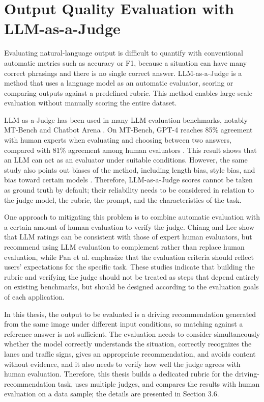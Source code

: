 \documentclass[12pt,a4paper]{report}
\begin{document}
\section{Output Quality Evaluation with LLM-as-a-Judge}

Evaluating natural-language output is difficult to quantify with conventional automatic metrics such as accuracy or F1, because a situation can have many correct phrasings and there is no single correct answer. LLM-as-a-Judge is a method that uses a language model as an automatic evaluator, scoring or comparing outputs against a predefined rubric. This method enables large-scale evaluation without manually scoring the entire dataset.

LLM-as-a-Judge has been used in many LLM evaluation benchmarks, notably MT-Bench and Chatbot Arena \cite{zheng2023mtbench}. On MT-Bench, GPT-4 reaches 85\% agreement with human experts when evaluating and choosing between two answers, compared with 81\% agreement among human evaluators \cite{zheng2023mtbench}. This result shows that an LLM can act as an evaluator under suitable conditions. However, the same study also points out biases of the method, including length bias, style bias, and bias toward certain models \cite{zheng2023mtbench}. Therefore, LLM-as-a-Judge scores cannot be taken as ground truth by default; their reliability needs to be considered in relation to the judge model, the rubric, the prompt, and the characteristics of the task.

One approach to mitigating this problem is to combine automatic evaluation with a certain amount of human evaluation to verify the judge. Chiang and Lee \cite{chiang2023llmhuman} show that LLM ratings can be consistent with those of expert human evaluators, but recommend using LLM evaluation to complement rather than replace human evaluation, while Pan et al. \cite{pan2024human} emphasize that the evaluation criteria should reflect users' expectations for the specific task. These studies indicate that building the rubric and verifying the judge should not be treated as steps that depend entirely on existing benchmarks, but should be designed according to the evaluation goals of each application.

In this thesis, the output to be evaluated is a driving recommendation generated from the same image under different input conditions, so matching against a reference answer is not sufficient. The evaluation needs to consider simultaneously whether the model correctly understands the situation, correctly recognizes the lanes and traffic signs, gives an appropriate recommendation, and avoids content without evidence, and it also needs to verify how well the judge agrees with human evaluation. Therefore, this thesis builds a dedicated rubric for the driving-recommendation task, uses multiple judges, and compares the results with human evaluation on a data sample; the details are presented in Section 3.6.
\end{document}

